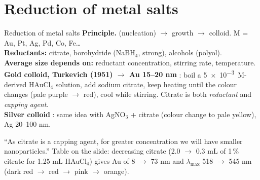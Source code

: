 \section{Reduction of metal salts}
\begin{cardbox}{Reduction of metal salts }
\textbf{Principle.}  (nucleation) $\to$ growth $\to$ colloid. M = Au, Pt, Ag, Pd, Co, Fe\ldots\\
\textbf{Reductants:} citrate, borohydride (NaBH$_4$, strong), alcohols (polyol).\\
\textbf{Average size depends on:} reductant concentration, stirring rate, temperature.\\[2pt]
\textbf{Gold colloid, Turkevich (1951) $\to$ Au 15--20 nm} : boil a \SI{5e-3}{M}-derived HAuCl$_4$ solution,
add sodium citrate, keep heating until the colour changes (pale purple $\to$ red), cool while stirring.
Citrate is both \emph{reductant} and \emph{capping agent}.\\
\textbf{Silver colloid} : same idea with AgNO$_3$ + citrate (colour change to pale yellow), Ag 20--100 nm.
\end{cardbox}
\begin{classbox}
 ``As citrate is a capping agent, for greater concentration we will have smaller nanoparticles.''
Table on the slide: decreasing citrate (2.0 $\to$ 0.3 mL of 1\,\% citrate for 1.25 mL HAuCl$_4$) gives
Au of 8 $\to$ 73 nm and $\lambda_\mathrm{max}$ 518 $\to$ 545 nm (dark red $\to$ red $\to$ pink $\to$ orange).
\end{classbox}

